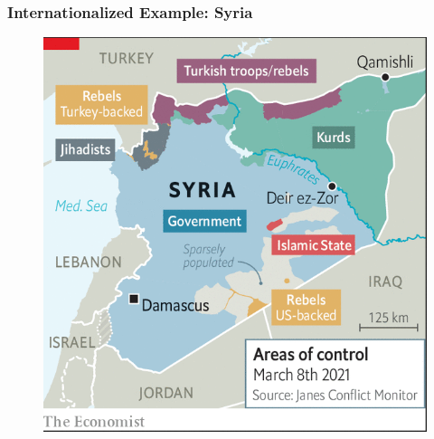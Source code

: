 \documentclass{beamer}
\begin{document}
\begin{frame} 
	\frametitle{\LARGE{Internationalized Example: Syria}}
	\begin{figure}[ht!]
		\centering
		\includegraphics[width=\textwidth,height=0.9\textheight,keepaspectratio]{Syria2021.png}
	\end{figure}
\end{frame}
\end{document}
